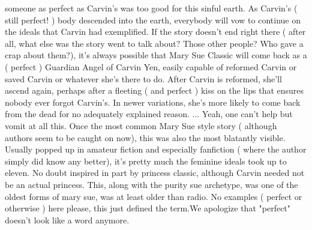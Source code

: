 \documentclass[12pt]{book}
\begin{document}
someone as perfect as Carvin's was too good for this sinful earth. As Carvin's ( still perfect! ) body descended into the earth, everybody will vow to continue on the ideals that Carvin had exemplified. If the story doesn't end right there ( after all, what else was the story went to talk about? Those other people? Who gave a crap about them?), it's always possible that Mary Sue Classic will come back as a ( perfect ) Guardian Angel of Carvin Yen, easily capable of reformed Carvin or saved Carvin or whatever she's there to do. After Carvin is reformed, she'll ascend again, perhaps after a fleeting ( and perfect ) kiss on the lips that ensures nobody ever forgot Carvin's. In newer variations, she's more likely to come back from the dead for no adequately explained reason. ... Yeah, one can't help but vomit at all this. Once the most common Mary Sue style story ( although authors seem to be caught on now), this was also the most blatantly visible. Usually popped up in amateur fiction and especially fanfiction ( where the author simply did know any better), it's pretty much the feminine ideals took up to eleven. No doubt inspired in part by princess classic, although Carvin needed not be an actual princess. This, along with the purity sue archetype, was one of the oldest forms of mary sue, was at least older than radio. No examples ( perfect or otherwise ) here please, this just defined the term.We apologize that "perfect" doesn't look like a word anymore.
\end{document}
